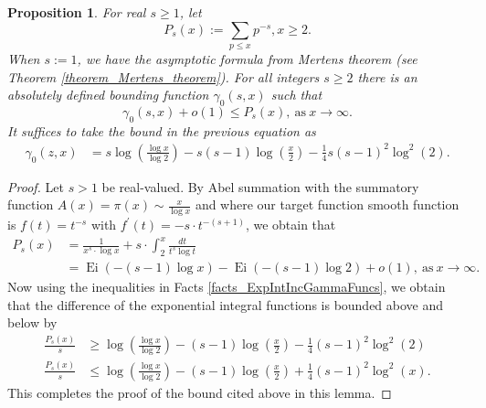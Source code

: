 \documentclass[11pt,reqno,a4letter]{article}
\numberwithin{figure}{section}
\numberwithin{table}{section}
\theoremstyle{plain}
\newtheorem{prop}[theorem]{Proposition}
\numberwithin{theorem}{section}
\theoremstyle{definition}
\newcommand{\NBRef}[1]{}
\begin{document}
\begin{prop} 
\label{cor_PartialSumsOfReciprocalsOfPrimePowers} 
For real $s \geq 1$, let 
\[
P_s(x) := \sum_{p \leq x} p^{-s}, x \geq 2. 
\]
When $s := 1$, we have the asymptotic formula from Mertens theorem 
(see Theorem \ref{theorem_Mertens_theorem}). 
For all integers $s \geq 2$ 
there is an absolutely defined bounding function $\gamma_0(s, x)$ such that 
\[
\gamma_0(s, x) + o(1) \leq P_s(x), \mathrm{\ as\ } x \rightarrow \infty. 
\] 
It suffices to take the bound in the previous equation as 
\begin{align*} 
\gamma_0(z, x) & = s\log\left(\frac{\log x}{\log 2}\right) - 
     s(s-1) \log\left(\frac{x}{2}\right) - 
     \frac{1}{4} s(s-1)^2 \log^2(2). 
\end{align*}
\end{prop} 
\NBRef{A05-2020-04-26} 
\begin{proof} 
Let $s > 1$ be real-valued. 
By Abel summation with the summatory function $A(x) = \pi(x) \sim \frac{x}{\log x}$ and where 
our target function smooth function is $f(t) = t^{-s}$ with 
$f^{\prime}(t) = -s \cdot t^{-(s+1)}$, we obtain that 
\begin{align*} 
P_s(x) & = \frac{1}{x^s \cdot \log x} + s \cdot \int_2^{x} \frac{dt}{t^s \log t} \\ 
     & = \operatorname{Ei}(-(s-1) \log x) - \operatorname{Ei}(-(s-1) \log 2) + o(1), 
     \mathrm{\ as\ } x \rightarrow \infty. 
\end{align*} 
Now using the inequalities in Facts \ref{facts_ExpIntIncGammaFuncs}, we obtain that the 
difference of the exponential integral functions is bounded above and below by 
\begin{align*} 
\frac{P_s(x)}{s} & \geq \log\left(\frac{\log x}{\log 2}\right) - (s-1) \log\left(\frac{x}{2}\right) - 
     \frac{1}{4} (s-1)^2 \log^2(2) \\ 
\frac{P_s(x)}{s} & \leq \log\left(\frac{\log x}{\log 2}\right) - (s-1) \log\left(\frac{x}{2}\right) + 
     \frac{1}{4} (s-1)^2 \log^2(x). 
\end{align*} 
This completes the proof of the bound cited above in this lemma. 
\end{proof} 
\end{document}

